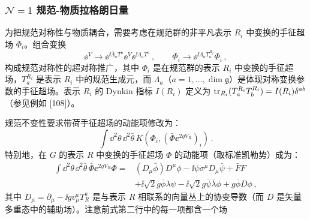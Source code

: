 \subsubsection*{$\mathcal{N}=1$ 规范-物质拉格朗日量}

为把规范对称性与物质耦合，需要考虑在规范群的非平凡表示 $R_i$ 中变换的手征超场 $\Phi_i$。组合变换
\begin{equation}
\ee^{V}\to\ee^{\ii\bar\Lambda_aT^a}\ee^{V}\ee^{\ii\Lambda_aT^a}\,,\qquad
\Phi_i\to\ee^{\ii\Lambda_aT^{R_i}_a}\Phi_i\,,
\tag{17.21}
\end{equation}
构成规范对称性的超对称推广，其中 $\Phi_i$ 是在规范群的表示 $R_i$ 中变换的手征超场，$T^{R_i}_a$ 是表示 $R_i$ 中的规范生成元，而 $\Lambda_a$（$a=1,\dots,\dim\mathfrak{g}$）是体现对称变换参数的手征超场。表示 $R_i$ 的 Dynkin 指标 $I(R_i)$ 定义为 $\operatorname{tr}_{R_i}(T^{R_i}_aT^{R_i}_b)=I(R_i)\delta^{ab}$（参见例如 [108]）。

规范不变性要求带荷手征超场的动能项修改为：
\begin{equation}
\int \dd^2\theta\,\dd^2\bar\theta\,K(\Phi_i,(\bar\Phi\ee^{2gV_R})_i)\,.
\tag{17.22}
\end{equation}
特别地，在 $G$ 的表示 $R$ 中变换的手征超场 $\Phi$ 的动能项（取标准凯勒势）成为：
\begin{equation}
\begin{aligned}
\int \dd^2\theta\,\dd^2\bar\theta\,\bar\Phi\ee^{2gV_R}\Phi={}&(D_\mu\bar\phi)D^\mu\phi-\ii\psi\sigma^\mu D_\mu\bar\psi+\bar F F\\
&+\ii\sqrt{2}g\bar\phi\lambda\psi-\ii\sqrt{2}g\bar\psi\bar\lambda\phi+g\bar\phi D\phi\,,
\end{aligned}
\tag{17.23}
\end{equation}
其中 $D_\mu=\partial_\mu-\ii gv^a_\mu T^a_R$ 是与表示 $R$ 相联系的向量丛上的协变导数（而 $D$ 是矢量多重态中的辅助场）。注意前式第二行中的每一项都含一个场


